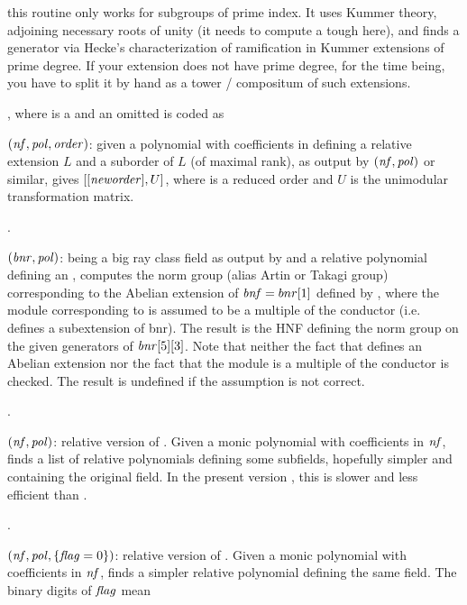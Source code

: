  this routine only works for subgroups of prime index. It
uses Kummer theory, adjoining necessary roots of unity (it needs to compute a
tough  here), and finds a generator via Hecke's characterization
of ramification in Kummer extensions of prime degree. If your extension does
not have prime degree, for the time being, you have to split it by hand as a
tower / compositum of such extensions.

, where
 is a  and an omitted  is coded as

$(\hbox{\it nf\/},\hbox{\it pol\/},\hbox{\it order\/})$: given a polynomial
 with coefficients in  defining a relative extension $L$ and
a suborder  of $L$ (of maximal rank), as output by
$(\hbox{\it nf\/},\hbox{\it pol\/})$ or similar, gives
$[[\hbox{\it neworder\/}],U]$, where  is a reduced order and $U$ is
the unimodular transformation matrix.

.

$(\hbox{\it bnr\/},\hbox{\it pol\/})$:  being a big ray
class field as output by  and  a relative polynomial
defining an , computes the norm group (alias Artin
or Takagi group) corresponding to the Abelian extension of $\hbox{\it bnf\/}=bnr[1]$
defined by , where the module corresponding to  is assumed
to be a multiple of the conductor (i.e.~ defines a subextension of
bnr). The result is the HNF defining the norm group on the given generators
of $\hbox{\it bnr\/}[5][3]$. Note that neither the fact that  defines an
Abelian extension nor the fact that the module is a multiple of the conductor
is checked. The result is undefined if the assumption is not correct.

.

$(\hbox{\it nf\/},\hbox{\it pol\/})$: relative version of .
Given a monic polynomial  with coefficients in $\hbox{\it nf\/}$, finds a
list of relative polynomials defining some subfields, hopefully simpler and
containing the original field. In the present version \vers, this is slower
and less efficient than .

.

$(\hbox{\it nf\/},\hbox{\it pol\/},\{\hbox{\it f\kern0pt lag\/}=0\})$: relative version of
. Given a monic polynomial  with coefficients in
$\hbox{\it nf\/}$, finds a simpler relative polynomial defining the same field. The
binary digits of $\hbox{\it f\kern0pt lag\/}$ mean

